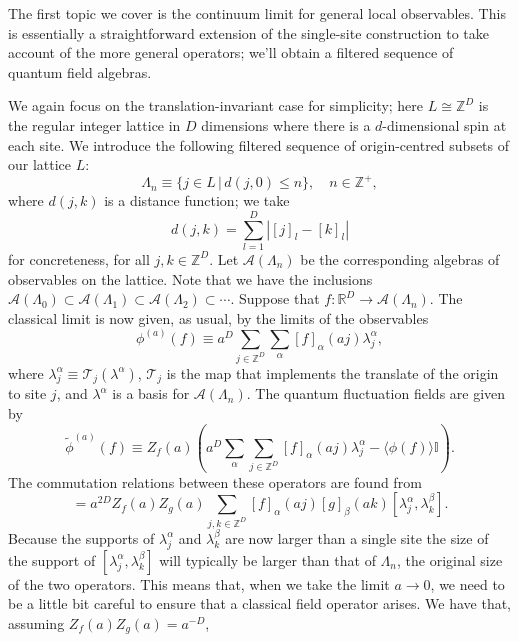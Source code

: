 \documentclass[prl,twocolumn,lengthcheck,superscriptaddress]{revtex4-1}
\theoremstyle{definition}
\theoremstyle{remark}
\begin{document}
The first topic we cover is the continuum limit for general local observables. This is essentially a straightforward extension of the single-site construction to take account of the more general operators; we'll obtain a filtered sequence of quantum field algebras. 

We again focus on the translation-invariant case for simplicity; here $L\cong \mathbb{Z}^{D}$ is the regular integer lattice in $D$ dimensions where there is a $d$-dimensional spin at each site.  We introduce the following filtered sequence of origin-centred subsets of our lattice $L$:
\begin{equation}
	\Lambda_n \equiv \{j\in L\,|\, d(j,0) \le n\}, \quad n\in \mathbb{Z}^+,
\end{equation}
where $d(j,k)$ is a distance function; we take
\begin{equation}
	d(j,k) = \sum_{l=1}^D |[j]_l-[k]_l|
\end{equation}
for concreteness, for all $j,k\in \mathbb{Z}^D$. Let $\mathcal{A}(\Lambda_n)$ be the corresponding algebras of observables on the lattice. Note that we have the inclusions $\mathcal{A}(\Lambda_0)\subset\mathcal{A}(\Lambda_1)\subset \mathcal{A}(\Lambda_2) \subset \cdots$. Suppose that $f:\mathbb{R}^D\rightarrow \mathcal{A}(\Lambda_n)$. The classical limit is now given, as usual, by the limits of the observables
\begin{equation}
	\phi^{(a)}(f) \equiv a^D\sum_{j\in\mathbb{Z}^D} \sum_{\alpha} [f]_\alpha(aj) \lambda_j^\alpha,
\end{equation}
where $\lambda_j^\alpha \equiv \mathcal{T}_j(\lambda^\alpha)$, $\mathcal{T}_j$ is the map that implements the translate of the origin to site $j$, and $\lambda^\alpha$ is a basis for $\mathcal{A}(\Lambda_n)$. The quantum fluctuation fields are given by
\begin{equation}
	\widetilde{\phi}^{(a)}(f) \equiv Z_f(a)\left( a^D\sum_{\alpha}\sum_{j\in \mathbb{Z}^D} [f]_\alpha(aj) \lambda^\alpha_j - \langle\phi(f)\rangle\mathbb{I}\right).
\end{equation}
The commutation relations between these operators are found from 
\begin{equation}
	[\widetilde{\phi}^{(a)}(f), \widetilde{\phi}^{(a)}(g)] = a^{2D}Z_f(a)Z_g(a)\sum_{j,k\in\mathbb{Z}^D} [f]_\alpha(aj)[g]_\beta(ak) [\lambda_j^\alpha, \lambda_k^\beta]. 
\end{equation} 
Because the supports of $\lambda_j^\alpha$ and $\lambda_k^\beta$ are now larger than a single site the size of the support of $[\lambda_j^\alpha, \lambda_k^\beta]$ will typically be larger than that of $\Lambda_n$, the original size of the two operators. This means that, when we take the limit $a\rightarrow 0$, we need to be a little bit careful to ensure that a classical field operator arises. We have that, assuming $Z_f(a)Z_g(a) = a^{-D}$,
\end{document}
